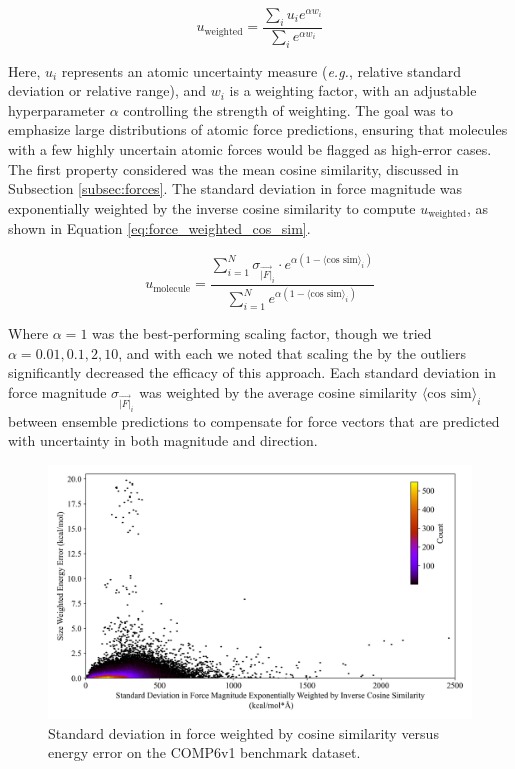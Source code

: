 \begin{equation} 
u_{\text{weighted}} = \frac{\sum_i u_i e^{\alpha w_i}}{\sum_i e^{\alpha w_i}} 
\label{eq:outliers-weighted_sum}
\end{equation}

Here, $u_i$ represents an atomic uncertainty measure (\textit{e.g.}, relative standard deviation or relative range), and $w_i$ is a weighting factor, with an adjustable hyperparameter $\alpha$ controlling the strength of weighting.
The goal was to emphasize large distributions of atomic force predictions, ensuring that molecules with a few highly uncertain atomic forces would be flagged as high-error cases.
The first property considered was the mean cosine similarity, discussed in Subsection \ref{subsec:forces}.
The standard deviation in force magnitude was exponentially weighted by the inverse cosine similarity to compute $u_{\text{weighted}}$, as shown in Equation \ref{eq:force_weighted_cos_sim}.

\begin{equation}
    u_{\text{molecule}} = \frac{\sum_{i=1}^{N} \sigma_{\vec{|F|}_i} \cdot e^{\alpha (1 - \langle \text{cos sim} \rangle_i)}}{\sum_{i=1}^{N} e^{\alpha (1 - \langle \text{cos sim} \rangle_i)}}
    \label{eq:force_weighted_cos_sim}
\end{equation}

Where $\alpha=1$ was the best-performing scaling factor, though we tried $\alpha=0.01, 0.1, 2, 10$, and with each we noted that scaling the by the outliers significantly decreased the efficacy of this approach. 
Each standard deviation in force magnitude $\sigma_{\vec{|F|}_i}$ was weighted by the average cosine similarity $\langle \text{cos sim} \rangle_i$ between ensemble predictions to compensate for force vectors that are predicted with uncertainty in both magnitude and direction.

\begin{figure}[!ht]
    \centering
    \includegraphics[width=1\linewidth]{Images/2xr_forces/cos_sim_exponential_weighting-vs-energy.png}
    \caption[Standard deviation in force magnitude weighted by cosine similarity versus energy error (COMP6v1)]{Standard deviation in force weighted by cosine similarity versus energy error on the COMP6v1 benchmark dataset.}
    \label{fig:cos_sim-weighted-uncertainty}
\end{figure}

